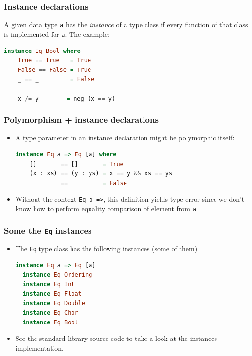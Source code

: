 \documentclass[10pt,pdf,utf8,russian,aspectratio=169]{beamer}
\begin{document}
\begin{frame}[fragile]
  \frametitle{Instance declarations}

  A given data type \verb"a" has the \emph{instance} of a type class if every function of that class is implemented for \verb"a". The example:

  \begin{lstlisting}[language=Haskell]
  instance Eq Bool where
    True == True   = True
    False == False = True
    _ == _         = False

    x /= y        = neg (x == y)
  \end{lstlisting}
\end{frame}

\begin{frame}[fragile]
  \frametitle{Polymorphism + instance declarations}

\begin{itemize}
  \item A type parameter in an instance declaration might be polymorphic itself:

  \begin{lstlisting}[language=Haskell]
  instance Eq a => Eq [a] where
    []       == []       = True
    (x : xs) == (y : ys) = x == y && xs == ys
    _        == _        = False
  \end{lstlisting}
  \item Without the context \verb"Eq a =>", this definition yields type error since we don't know how to perform
  equality comparison of element from \verb"a"
\end{itemize}
\end{frame}

\begin{frame}[fragile]
  \frametitle{Some the \verb"Eq" instances}

\begin{itemize}
\item The \verb"Eq" type class has the following instances (some of them)

  \begin{lstlisting}[language=Haskell]
  instance Eq a => Eq [a]
  instance Eq Ordering
  instance Eq Int
  instance Eq Float
  instance Eq Double
  instance Eq Char
  instance Eq Bool
  \end{lstlisting}
\item See the standard library source code to take a look at the instances implementation.
\end{itemize}
\end{frame}
\end{document}
